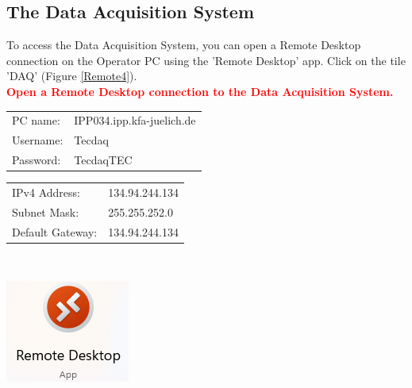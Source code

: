 \documentclass[fleqn,a4paper,20pt]{article}
\begin{document}
\subsection{The Data Acquisition System}
\begin{minipage}{.78\textwidth}
	To access the Data Acquisition System, you can open a Remote Desktop connection on the Operator PC using the 'Remote Desktop' app. Click on the tile 'DAQ' (Figure \ref{Remote4}).\\
	
	\textcolor{red}{\textbf{Open a Remote Desktop connection to the  Data Acquisition System.}}\\
	
	\begin{minipage}{.58\textwidth}
		\begin{tabular}{ll}
			PC name: & IPP034.ipp.kfa-juelich.de\\
			Username: &Tecdaq\\
			Password: &TecdaqTEC
		\end{tabular}
	\end{minipage}
	\begin{minipage}{.42\textwidth}
		\begin{tabular}{ll}
			IPv4 Address: & 134.94.244.134\\
			Subnet Mask:& 255.255.252.0\\
			Default Gateway:& 134.94.244.134
		\end{tabular}
	\end{minipage}
	\vspace{0.6cm}
	
\end{minipage}
\begin{minipage}{.02\textwidth}
	$\ $\\
\end{minipage}
\begin{minipage}{.2\textwidth}
	\centering
	\includegraphics[width=0.85\linewidth]{Remote1}
\end{minipage}
\end{document}
